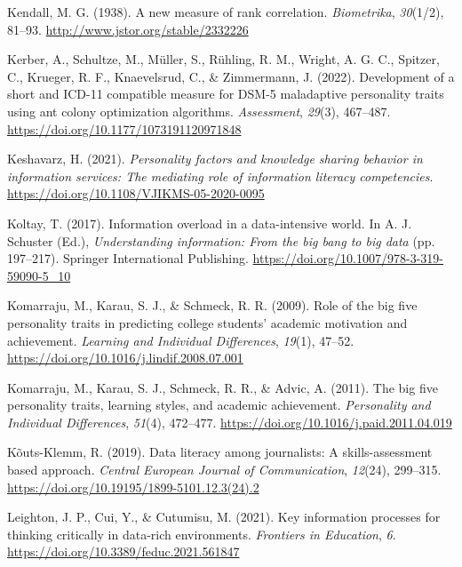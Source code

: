 \documentclass[
  12pt,
  a4paper,
  twoside]{article}
\newlength{\cslhangindent}
\newenvironment{CSLReferences}[2] %
 {\begin{list}{}{%
  \setlength{\itemindent}{0pt}
  \setlength{\leftmargin}{0pt}
  \setlength{\parsep}{0pt}
  \ifodd #1
   \setlength{\leftmargin}{\cslhangindent}
   \setlength{\itemindent}{-1\cslhangindent}
  \fi
  \setlength{\itemsep}{#2\baselineskip}}}
 {\end{list}}
\begin{document}
\begin{CSLReferences}{1}{0}
Kendall, M. G. (1938). A new measure of rank correlation. \emph{Biometrika}, \emph{30}(1/2), 81--93. \url{http://www.jstor.org/stable/2332226}

Kerber, A., Schultze, M., Müller, S., Rühling, R. M., Wright, A. G. C., Spitzer, C., Krueger, R. F., Knaevelsrud, C., \& Zimmermann, J. (2022). Development of a short and ICD-11 compatible measure for DSM-5 maladaptive personality traits using ant colony optimization algorithms. \emph{Assessment}, \emph{29}(3), 467--487. \url{https://doi.org/10.1177/1073191120971848}

Keshavarz, H. (2021). \emph{Personality factors and knowledge sharing behavior in information services: The mediating role of information literacy competencies}. \url{https://doi.org/10.1108/VJIKMS-05-2020-0095}

Koltay, T. (2017). Information overload in a data-intensive world. In A. J. Schuster (Ed.), \emph{Understanding information: From the big bang to big data} (pp. 197--217). Springer International Publishing. \url{https://doi.org/10.1007/978-3-319-59090-5_10}

Komarraju, M., Karau, S. J., \& Schmeck, R. R. (2009). Role of the big five personality traits in predicting college students' academic motivation and achievement. \emph{Learning and Individual Differences}, \emph{19}(1), 47--52. \url{https://doi.org/10.1016/j.lindif.2008.07.001}

Komarraju, M., Karau, S. J., Schmeck, R. R., \& Advic, A. (2011). The big five personality traits, learning styles, and academic achievement. \emph{Personality and Individual Differences}, \emph{51}(4), 472--477. \url{https://doi.org/10.1016/j.paid.2011.04.019}

Kõuts-Klemm, R. (2019). Data literacy among journalists: A skills-assessment based approach. \emph{Central European Journal of Communication}, \emph{12}(24), 299--315. \url{https://doi.org/10.19195/1899-5101.12.3(24).2}

Leighton, J. P., Cui, Y., \& Cutumisu, M. (2021). Key information processes for thinking critically in data-rich environments. \emph{Frontiers in Education}, \emph{6}. \url{https://doi.org/10.3389/feduc.2021.561847}


\end{CSLReferences}
\end{document}
